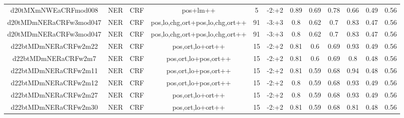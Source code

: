 \documentclass[a4paper]{article}
\begin{document}
\begin{landscape}
\begin{center}
\begin{tabular}{ |c|c|c|c|c|c|c|c|c|c|c|c|}
 	
 
 	
 		
 		\small{ d20tMXmNWEaCRFmod008 } & NER & CRF & pos+lm++  &  5 &  -2:+2  &  0.89 & 0.69 & 0.78  &  0.66 & 0.49 & 0.56 \\
 		

 	
 
 	
 		
 		\small{ d20tMDmNERaCRFw3mod047 } & NER & CRF & pos,lo,chg,ort+pos,lo,chg,ort++  &  91 &  -3:+3  &  0.8 & 0.62 & 0.7  &  0.83 & 0.47 & 0.56 \\
 		

 	
 
 	
 		
 		\small{ d20tMDmNERaCRFw3mod047 } & NER & CRF & pos,lo,chg,ort+pos,lo,chg,ort++  &  91 &  -3:+3  &  0.8 & 0.62 & 0.7  &  0.83 & 0.47 & 0.56 \\
 		

 	
 
 	
 		
 		\small{ d22btMDmNERaCRFw2m22 } & NER & CRF & pos,ort,lo+ort++  &  15 &  -2:+2  &  0.81 & 0.6 & 0.69  &  0.93 & 0.49 & 0.56 \\
 		

 	
 
 	
 		
 		\small{ d22btMDmNERaCRFw2m7 } & NER & CRF & pos,ort,lo+pos,ort++  &  15 &  -2:+2  &  0.81 & 0.6 & 0.69  &  0.8 & 0.48 & 0.56 \\
 		

 	
 
 	
 		
 		\small{ d22btMDmNERaCRFw2m11 } & NER & CRF & pos,ort,lo+pos,ort++  &  15 &  -2:+2  &  0.81 & 0.59 & 0.68  &  0.94 & 0.48 & 0.56 \\
 		

 	
 
 	
 		
 		\small{ d22btMDmNERaCRFw2m12 } & NER & CRF & pos,ort,lo+pos,ort++  &  15 &  -2:+2  &  0.8 & 0.59 & 0.68  &  0.93 & 0.49 & 0.56 \\
 		

 	
 
 	
 		
 		\small{ d22btMDmNERaCRFw2m27 } & NER & CRF & pos,ort,lo+ort++  &  15 &  -2:+2  &  0.8 & 0.59 & 0.68  &  0.93 & 0.49 & 0.56 \\
 		

 	
 
 	
 		
 		\small{ d22btMDmNERaCRFw2m30 } & NER & CRF & pos,ort,lo+ort++  &  15 &  -2:+2  &  0.81 & 0.59 & 0.68  &  0.81 & 0.48 & 0.56 \\
 		


\end{tabular}
\end{center}
\end{landscape}
\end{document}
